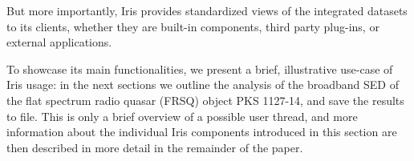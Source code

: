 \documentclass[final,5p,authoryear]{elsarticle}
\begin{document}
But more importantly, Iris provides standardized views of the integrated
datasets to its clients, whether they are built-in components, third party
plug-ins, or external applications.


To showcase its main functionalities, we present a brief, illustrative use-case
of Iris usage: in the next sections we outline the analysis of the broadband SED
of the flat spectrum radio quasar (FRSQ) object PKS 1127-14, and save the
results to file. This is only a brief overview of a possible user thread, and
more information about the individual Iris components introduced in this section
are then described in more detail in the remainder of the paper.



\end{document}
